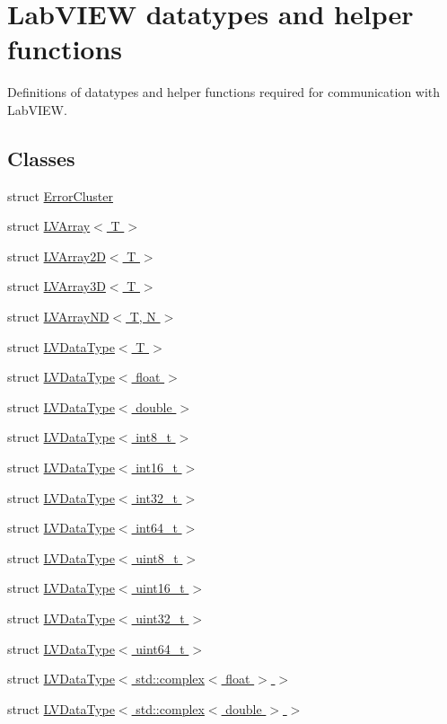 \hypertarget{group__lab__functions}{}\section{Lab\+V\+I\+EW datatypes and helper functions}
\label{group__lab__functions}


Definitions of datatypes and helper functions required for communication with Lab\+V\+I\+EW.  


\subsection*{Classes}
\begin{DoxyCompactItemize}
\item 
struct \hyperlink{struct_error_cluster}{Error\+Cluster}
\item 
struct \hyperlink{struct_l_v_array}{L\+V\+Array$<$ T $>$}
\item 
struct \hyperlink{struct_l_v_array2_d}{L\+V\+Array2\+D$<$ T $>$}
\item 
struct \hyperlink{struct_l_v_array3_d}{L\+V\+Array3\+D$<$ T $>$}
\item 
struct \hyperlink{struct_l_v_array_n_d}{L\+V\+Array\+N\+D$<$ T, N $>$}
\item 
struct \hyperlink{struct_l_v_data_type}{L\+V\+Data\+Type$<$ T $>$}
\item 
struct \hyperlink{struct_l_v_data_type_3_01float_01_4}{L\+V\+Data\+Type$<$ float $>$}
\item 
struct \hyperlink{struct_l_v_data_type_3_01double_01_4}{L\+V\+Data\+Type$<$ double $>$}
\item 
struct \hyperlink{struct_l_v_data_type_3_01int8__t_01_4}{L\+V\+Data\+Type$<$ int8\+\_\+t $>$}
\item 
struct \hyperlink{struct_l_v_data_type_3_01int16__t_01_4}{L\+V\+Data\+Type$<$ int16\+\_\+t $>$}
\item 
struct \hyperlink{struct_l_v_data_type_3_01int32__t_01_4}{L\+V\+Data\+Type$<$ int32\+\_\+t $>$}
\item 
struct \hyperlink{struct_l_v_data_type_3_01int64__t_01_4}{L\+V\+Data\+Type$<$ int64\+\_\+t $>$}
\item 
struct \hyperlink{struct_l_v_data_type_3_01uint8__t_01_4}{L\+V\+Data\+Type$<$ uint8\+\_\+t $>$}
\item 
struct \hyperlink{struct_l_v_data_type_3_01uint16__t_01_4}{L\+V\+Data\+Type$<$ uint16\+\_\+t $>$}
\item 
struct \hyperlink{struct_l_v_data_type_3_01uint32__t_01_4}{L\+V\+Data\+Type$<$ uint32\+\_\+t $>$}
\item 
struct \hyperlink{struct_l_v_data_type_3_01uint64__t_01_4}{L\+V\+Data\+Type$<$ uint64\+\_\+t $>$}
\item 
struct \hyperlink{struct_l_v_data_type_3_01std_1_1complex_3_01float_01_4_01_4}{L\+V\+Data\+Type$<$ std\+::complex$<$ float $>$ $>$}
\item 
struct \hyperlink{struct_l_v_data_type_3_01std_1_1complex_3_01double_01_4_01_4}{L\+V\+Data\+Type$<$ std\+::complex$<$ double $>$ $>$}
\end{DoxyCompactItemize}
